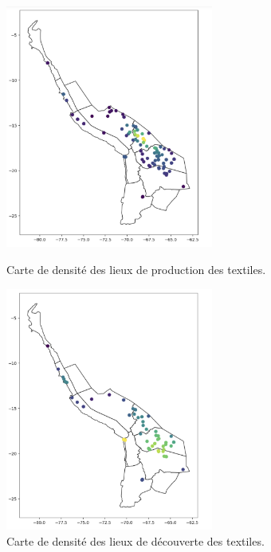\begin{figure}[!h]
    \begin{minipage}[c]{.5\linewidth}
            \begin{center}
                \includegraphics[height=8cm]{../images/densitymapprod.png}
            \end{center}
            \caption{Carte de densité des lieux de production des textiles.}
            \label{fig:densityProd}   
    \end{minipage}
\hspace{5pt}
        \begin{minipage}[c]{.5\linewidth}
        \begin{center}
        		\includegraphics[height=8cm]{../images/densitymapfind.png}
	\end{center}
	\caption{Carte de densité des lieux de découverte des textiles.}
	\label{fig:densityFind}   
    \end{minipage}
\end{figure}

